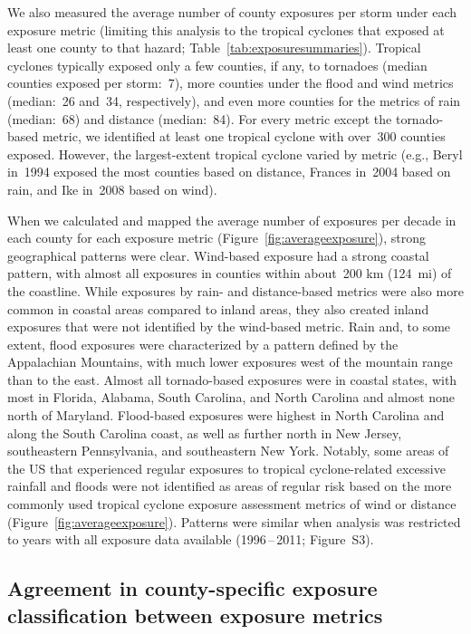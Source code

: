 We also measured the average number of county exposures per storm under each
exposure metric (limiting this analysis to the tropical cyclones that exposed
at least one county to that hazard; Table~\ref{tab:exposuresummaries}).
Tropical cyclones typically exposed only a few counties, if any, to tornadoes
(median counties exposed per storm:~7), more counties under the flood and wind
metrics (median:~26 and~34, respectively), and even more counties for the
metrics of rain (median:~68) and distance (median:~84).  For every metric
except the tornado-based metric, we identified at least one tropical cyclone
with over~300 counties exposed.  However, the largest-extent tropical cyclone
varied by metric (e.g., Beryl in~1994 exposed the most counties based on
distance, Frances in~2004 based on rain, and Ike in~2008 based on wind).

When we calculated and mapped the average number of exposures per decade in
each county for each exposure metric (Figure~\ref{fig:averageexposure}), strong
geographical patterns were clear. Wind-based exposure had a strong coastal
pattern, with almost all exposures in counties within about~200
\si{\kilo\metre} (124~mi) of the coastline. While exposures by rain- and
distance-based metrics were also more common in coastal areas compared to
inland areas, they also created inland exposures that were not identified by
the wind-based metric. Rain and, to some extent, flood exposures were
characterized by a pattern defined by the Appalachian Mountains, with much
lower exposures west of the mountain range than to the east. Almost all
tornado-based exposures were in coastal states, with most in Florida, Alabama,
South Carolina, and North Carolina and almost none north of Maryland.
Flood-based exposures were highest in North Carolina and along the South
Carolina coast, as well as further north in New Jersey, southeastern
Pennsylvania, and southeastern New York. Notably, some areas of the \ac{US}
that experienced regular exposures to tropical cyclone-related excessive
rainfall and floods were not identified as areas of regular risk based on the
more commonly used tropical cyclone exposure assessment metrics of wind or
distance (Figure~\ref{fig:averageexposure}). Patterns were similar when
analysis was restricted to years with all exposure data available
(1996\,--\,2011; Figure~S3). 

\subsection*{Agreement in county-specific exposure classification between exposure metrics}

